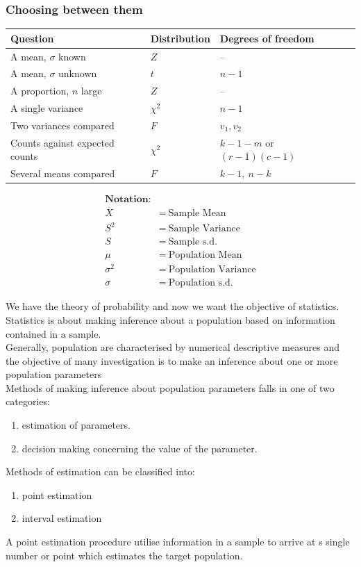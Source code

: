 \documentclass[11pt,a4paper]{article}
\theoremstyle{definition}
\begin{document}
\subsubsection{Choosing between them}

\begin{table}[H]
\centering
\begin{tabular}{lll}
Question & Distribution & Degrees of freedom\\
\hline
A mean, $\sigma$ known & $Z$ & --\\
A mean, $\sigma$ unknown & $t$ & $n-1$\\
A proportion, $n$ large & $Z$ & --\\
A single variance & $\chi^2$ & $n-1$\\
Two variances compared & $F$ & $v_1, v_2$\\
Counts against expected counts & $\chi^2$ & $k-1-m$ or $(r-1)(c-1)$\\
Several means compared & $F$ & $k-1,\ n-k$\\
\end{tabular}
\end{table}

\begin{align*}
\textbf{Notation:} & \\ 
\overline{X}&=\ \text{Sample Mean}\\
S^2&=\ \text{Sample Variance}\\
S&=\ \text{Sample s.d.}\\
\mu &=\ \text{Population Mean}\\
\sigma^2&=\ \text{Population Variance}\\
\sigma &=\ \text{Population s.d.}
\end{align*}



We have the theory of probability and now we want the objective of statistics.\\[1ex] Statistics is about making inference about a population based on information contained in a sample.\\ Generally, population are characterised by numerical descriptive measures and the objective of many investigation is to make an inference about one or more population parameters\\[1ex] Methods of making inference about population parameters falls in one of two categories:
\begin{enumerate}
\item estimation of parameters.
\item decision making concerning the value of the parameter.\\
\end{enumerate}
Methods of estimation can be classified into:
\begin{enumerate}
\item point estimation
\item interval estimation\\
\end{enumerate}
A point estimation procedure utilise information in a sample to arrive at s single number or point which estimates the target population.\\
\end{document}
